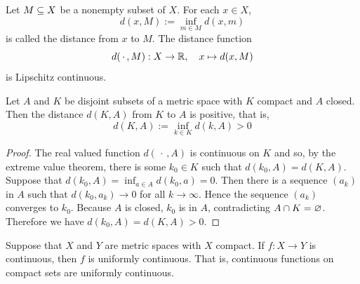 \begin{proposition}
Let $M\subseteq X$ be a nonempty subset of $X$. For each $x\in X$, 
\[d(x,M):=\inf_{m\in M}d(x,m)\]
is called the distance from $x$ to $M$. The distance function 
\[d(\,\cdot\,,M):X\to \mathbb{R},\quad x\mapsto d(x,M)\]
is Lipschitz continuous.
\end{proposition}
\begin{proposition}\label{distance >0}
Let $A$ and $K$ be disjoint subsets of a metric space with $K$ compact and $A$
closed. Then the distance $d(K,A)$ from $K$ to $A$ is positive, that is,
\[d(K,A):=\inf_{k\in K}d(k,A)>0\]
\end{proposition}
\begin{proof}
The real valued function $d(\,\cdot\,,A)$ is continuous on $K$ and so, by the extreme value theorem, there is some $k_0\in K$ such that $d(k_0,A)=d(K,A)$. Suppose that $d(k_0,A)=\inf_{a\in A}d(k_0,a)=0$. Then there is a sequence $(a_k)$ in $A$ such that $d(k_0,a_k)\to 0$ for all $k\to\infty$. Hence the sequence $(a_k)$ converges to $k_0$. Because $A$ is closed, $k_0$ is in $A$, contradicting $A\cap K=\varnothing$. Therefore we have $d(k_0,A)=d(K,A)>0$.
\end{proof}
\begin{theorem}\label{compact uni cont}
Suppose that $X$ and $Y$ are metric spaces with $X$ compact. If $f:X\to Y$ is continuous, then $f$ is uniformly continuous. That is, continuous functions on compact sets are uniformly continuous.
\end{theorem}
\vspace{5mm}

